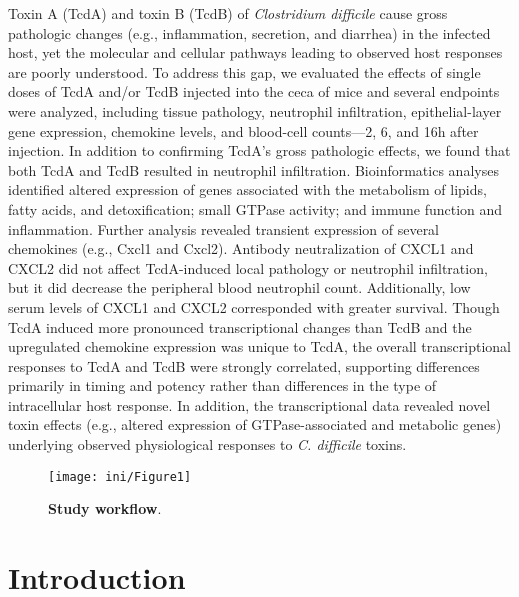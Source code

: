 Toxin A (TcdA) and toxin B (TcdB) of \textit{Clostridium difficile} cause gross 
pathologic changes (e.g., inflammation, secretion, and diarrhea) in the infected
host, yet the molecular and cellular pathways leading to observed host responses
are poorly understood. To address this gap, we evaluated the effects of single
doses of TcdA and/or TcdB injected into the ceca of mice and several endpoints
were analyzed, including tissue pathology, neutrophil infiltration, epithelial-layer 
gene expression, chemokine levels, and blood-cell counts—2, 6, and 16h after
injection. In addition to confirming TcdA's gross pathologic effects, we 
found that both TcdA and TcdB resulted in neutrophil infiltration. Bioinformatics 
analyses identified altered expression of genes associated with the metabolism 
of lipids, fatty acids, and detoxification; small GTPase activity; and immune
function and inflammation. Further analysis revealed transient expression of 
several chemokines (e.g., Cxcl1 and Cxcl2). Antibody neutralization of CXCL1
and CXCL2 did not affect TcdA-induced local pathology or neutrophil 
infiltration, but it did decrease the peripheral blood neutrophil count. 
Additionally, low serum levels of CXCL1 and CXCL2 corresponded with greater 
survival. Though TcdA induced more pronounced transcriptional changes than 
TcdB and the upregulated chemokine expression was unique to TcdA, the 
overall transcriptional responses to TcdA and TcdB were strongly correlated, 
supporting differences primarily in timing and potency rather than differences 
in the type of intracellular host response. In addition, the transcriptional 
data revealed novel toxin effects (e.g., altered expression of GTPase-associated 
and metabolic genes) underlying observed physiological responses to 
\textit{C. difficile} toxins.

\begin{figure}[h!]
  \centering
  \texttt{[image: ini/Figure1]}
  \caption[Study workflow]{
       \textbf{Study workflow}.
  }
  \label{ini:fig1}
\end{figure}


\section{Introduction}

